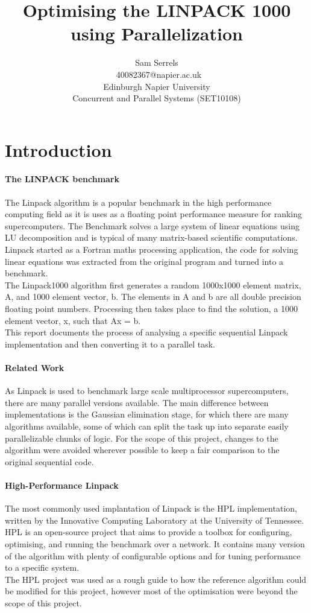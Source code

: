 \documentclass[conference]{acmsiggraph}
\title{Optimising the LINPACK 1000 using Parallelization}
\author{Sam Serrels\\\ 40082367@napier.ac.uk \\
Edinburgh Napier University\\
Concurrent and Parallel Systems (SET10108)}
\begin{document}
\maketitle

\section{Introduction}

\paragraph{The LINPACK benchmark}
The Linpack algorithm is a popular benchmark in the high performance computing field as it is uses as a floating point performance measure for ranking supercomputers.
The Benchmark solves a large system of linear equations using LU decomposition and is typical of many matrix-based scientific computations.
Linpack started as a Fortran maths processing application, the code for solving linear equations was extracted from the original program and turned into a benchmark.  
\\
The Linpack1000 algorithm first generates a random 1000x1000 element matrix, A, and 1000 element vector, b. The elements in A and b are all double precision floating point numbers. 
Processing then takes place to find the solution, a 1000 element vector, x, such that Ax = b.
\\
This report documents the process of analysing a specific sequential Linpack implementation and then converting it to a parallel task.

\paragraph{Related Work}
As Linpack is used to benchmark large scale multiprocessor supercomputers, there are many parallel versions available. 
The main difference between implementations is the Gaussian elimination stage, for which there are many algorithms available, some of which can split the task up into separate easily parallelizable chunks of logic. For the scope of this project, changes to the algorithm were avoided wherever possible to keep a fair comparison to the original sequential code.

\paragraph{High-Performance Linpack}
The most commonly used implantation of Linpack is the HPL implementation, written by the Innovative Computing Laboratory at the University of Tennessee. 
HPL is an open-source project that aims to provide a toolbox for configuring, optimising, and running the benchmark over a network. 
It contains many version of the algorithm with plenty of configurable options and for tuning performance to a specific system.
\\
The HPL project was used as a rough guide to how the reference algorithm could be modified for this project, however most of the optimisation were beyond the scope of this project.
\end{document}
